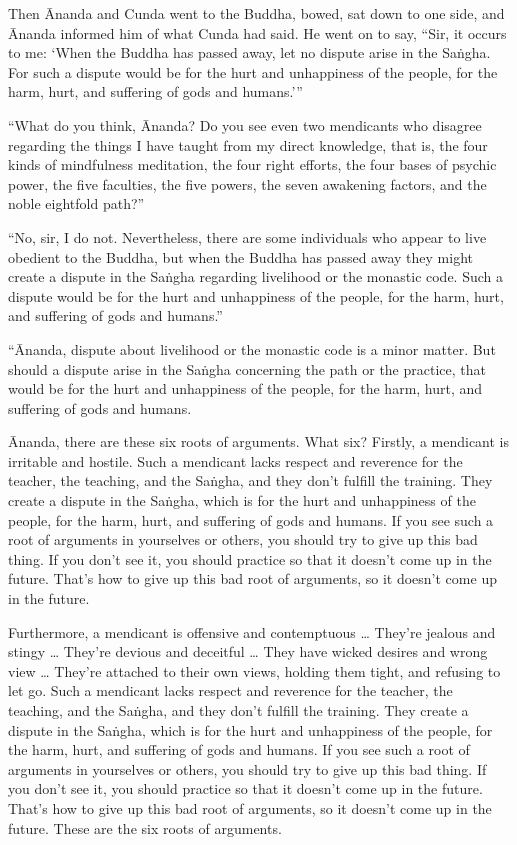 \documentclass[12pt,openany]{book}%
\begin{document}
Then Ānanda and Cunda went to the Buddha, bowed, sat down to one side, and Ānanda informed him of what Cunda had said. He went on to say, “Sir, it occurs to me: ‘When the Buddha has passed away, let no dispute arise in the \textsanskrit{Saṅgha}. For such a dispute would be for the hurt and unhappiness of the people, for the harm, hurt, and suffering of gods and humans.’” 

“What do you think, Ānanda? Do you see even two mendicants who disagree regarding the things I have taught from my direct knowledge, that is, the four kinds of mindfulness meditation, the four right efforts, the four bases of psychic power, the five faculties, the five powers, the seven awakening factors, and the noble eightfold path?” 

“No, sir, I do not. Nevertheless, there are some individuals who appear to live obedient to the Buddha, but when the Buddha has passed away they might create a dispute in the \textsanskrit{Saṅgha} regarding livelihood or the monastic code. Such a dispute would be for the hurt and unhappiness of the people, for the harm, hurt, and suffering of gods and humans.” 

“Ānanda, dispute about livelihood or the monastic code is a minor matter. But should a dispute arise in the \textsanskrit{Saṅgha} concerning the path or the practice, that would be for the hurt and unhappiness of the people, for the harm, hurt, and suffering of gods and humans. 

Ānanda, there are these six roots of arguments. What six? Firstly, a mendicant is irritable and hostile. Such a mendicant lacks respect and reverence for the teacher, the teaching, and the \textsanskrit{Saṅgha}, and they don’t fulfill the training. They create a dispute in the \textsanskrit{Saṅgha}, which is for the hurt and unhappiness of the people, for the harm, hurt, and suffering of gods and humans. If you see such a root of arguments in yourselves or others, you should try to give up this bad thing. If you don’t see it, you should practice so that it doesn’t come up in the future. That’s how to give up this bad root of arguments, so it doesn’t come up in the future. 

Furthermore, a mendicant is offensive and contemptuous … They’re jealous and stingy … They’re devious and deceitful … They have wicked desires and wrong view … They’re attached to their own views, holding them tight, and refusing to let go. Such a mendicant lacks respect and reverence for the teacher, the teaching, and the \textsanskrit{Saṅgha}, and they don’t fulfill the training. They create a dispute in the \textsanskrit{Saṅgha}, which is for the hurt and unhappiness of the people, for the harm, hurt, and suffering of gods and humans. If you see such a root of arguments in yourselves or others, you should try to give up this bad thing. If you don’t see it, you should practice so that it doesn’t come up in the future. That’s how to give up this bad root of arguments, so it doesn’t come up in the future. These are the six roots of arguments. 
\end{document}
